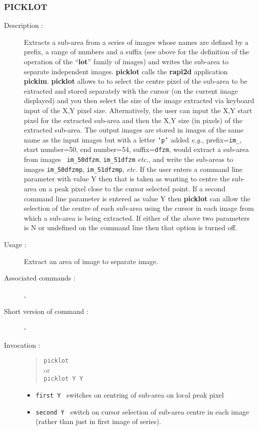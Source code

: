 \subsubsection*{\label{PICKLOT}PICKLOT}

\begin{description}

\item[Description :] Extracts a sub-area from a series of images whose
names are defined by a prefix, a range of numbers and a suffix (see
above for the definition of the operation of the ``{\bf lot}'' family
of images) and writes the sub-area to separate independent images.
{\bf picklot} calls the {\bf rapi2d} application {\bf pickim}.  {\bf
picklot} allows to to select the centre pixel of the sub-area to be
extracted and stored separately with the cursor (on the current image
displayed) and you then select the size of the image extracted via
keyboard input of the X,Y pixel size.  Alternatively, the user can
input the X,Y start pixel for the extracted sub-area and then the X,Y
size (in pixels) of the extracted sub-area.  The output images are
stored in images of the same name as the input images but with a letter
{\tt `p'} added \emph{e.g.}, prefix={\tt im\_}, start number=50, end
number=54, suffix={\tt dfzm}, would extract a sub-area from images {\tt
im\_50dfzm}, {\tt im\_51dfzm} \emph{etc.}, and write the sub-areas to
images {\tt im\_50dfzmp}, {\tt im\_51dfzmp}, \emph{etc.}  If the user
enters a command line parameter with value Y then that is taken as
wanting to centre the sub-area on a peak pixel close to the cursor
selected point.  If a second command line parameter is entered as value
Y then {\bf picklot} can allow the selection of the centre of each
sub-area using the cursor in each image from which a sub-area is being
extracted.  If either of the above two parameters is N or undefined on
the command line then that option is turned off.

\item[Usage :] Extract an area of image to separate image.
\item[Associated commands :] {\tt {}},
{\tt {}}
\item[Short version of command :] -
\item[Invocation :]

\begin{quote}{\tt  picklot }\\
or \\
{\tt picklot Y Y }
\end{quote}

\begin{itemize}

\item {\tt first Y } switches on centring of sub-area on local peak pixel
\item {\tt second Y } switch on cursor selection of sub-area centre in
 each image (rather than just in first image of series).
\end{itemize}

\end{description}

